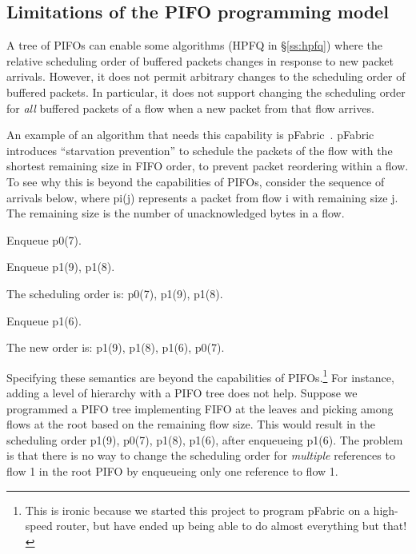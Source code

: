 \subsection{Limitations of the PIFO programming model}
\label{pifo_ss:limitations}

A tree of PIFOs can enable some algorithms (\eg HPFQ in \S\ref{ss:hpfq}) where
the relative scheduling order of buffered packets changes in response to new
packet arrivals. However, it does not permit arbitrary changes to the
scheduling order of buffered packets. In particular, it does not support
changing the scheduling order for {\em all} buffered packets of a flow when a
new packet from that flow arrives.

An example of an algorithm that needs this capability is
pFabric~\cite{pFabric}. pFabric introduces ``starvation prevention'' to
schedule the packets of the flow with the shortest remaining size in FIFO
order, to prevent packet reordering within a flow. To see why this is beyond
the capabilities of PIFOs, consider the sequence of arrivals below, where pi(j)
represents a packet from flow i with remaining size j. The remaining size
is the number of unacknowledged bytes in a flow.
\begin{CompactEnumerate}
\item Enqueue p0(7).
\item Enqueue p1(9), p1(8).
\item The scheduling order is: p0(7), p1(9), p1(8).
\item Enqueue p1(6).
\item The new order is: p1(9), p1(8), p1(6), p0(7).
\end{CompactEnumerate}

Specifying these semantics are beyond the capabilities of PIFOs.\footnote{This
is ironic because we started this project to program pFabric on a high-speed
router, but have ended up being able to do almost everything but that!} For
instance, adding a level of hierarchy with a PIFO tree does not help. Suppose
we programmed a PIFO tree implementing FIFO at the leaves and picking among
flows at the root based on the remaining flow size. This would result in the
scheduling order p1(9), p0(7), p1(8), p1(6), after enqueueing p1(6). The problem
is that there is no way to change the scheduling order for {\em multiple}
references to flow 1 in the root PIFO by enqueueing only one reference to flow
1.

